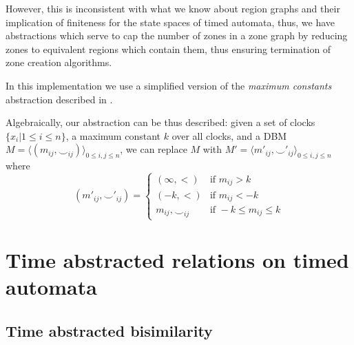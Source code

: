 However, this is inconsistent with what
we know about region graphs and their
implication of finiteness for the state spaces of timed automata,
thus, we have abstractions which serve to cap the number of zones in a
zone graph by reducing zones to equivalent regions which contain them,
thus ensuring termination of zone creation algorithms.

In this implementation we use a simplified version of the
\emph{maximum constants} abstraction described in
\cite{Behrmann03staticguard}.

Algebraically, our abstraction can be thus described: given a set of
clocks $\{x_i | 1 \leq i \leq n \}$, a maximum constant $k$ over all
clocks, and a DBM $M = \langle (m_{ij}, \smile _{ij})\rangle _{0 \leq
  i,j \leq n} $, we can replace $M$ with $M' = \langle m'_{ij}, \smile
'_{ij}\rangle _{0 \leq i,j \leq n} $ where
\begin{displaymath}
  (m'_{ij}, \smile'_{ij}) =
    \begin{cases}
      (\infty, <)  & \mbox{if } m_{ij} > k \\
      (-k, <)  & \mbox{if } m_{ij} < -k \\
      m_{ij}, \smile _{ij} & \mbox{if } -k \leq m_{ij} \leq k
    \end{cases}
\end{displaymath}

\section{Time abstracted relations on timed automata}

\subsection{Time abstracted bisimilarity}

